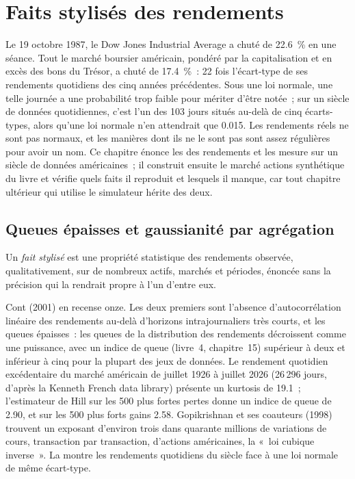 \chapter{Faits stylisés des rendements}\label{ch:rs:stylised-facts-of-returns}

Le 19 octobre 1987, le Dow Jones Industrial Average a chuté de 22.6~\% en une séance. Tout le marché boursier américain, pondéré par la capitalisation et
en excès des bons du Trésor, a chuté de 17.4~\%~: 22 fois l'écart-type de ses rendements quotidiens des cinq années précédentes. Sous une loi normale,
une telle journée a une probabilité trop faible pour mériter d'être notée~; sur un siècle de données quotidiennes, c'est l'un des 103 jours situés au-delà de cinq
écarts-types, alors qu'une loi normale n'en attendrait que 0.015. Les rendements réels ne sont pas normaux, et les manières dont ils ne le sont pas sont
assez régulières pour avoir un nom. Ce chapitre énonce les  des rendements et les mesure sur un siècle de données américaines~; il
construit ensuite le marché actions synthétique du livre et vérifie quels faits il reproduit et lesquels il manque, car tout chapitre ultérieur
qui utilise le simulateur hérite des deux.

\section{Queues épaisses et gaussianité par agrégation}

\begin{definition}\label{def:rs:stylised-facts-of-returns:fact}
Un \emph{fait stylisé} est une propriété statistique des rendements observée, qualitativement, sur de nombreux actifs,
marchés et périodes, énoncée sans la précision qui la rendrait propre à l'un d'entre eux.
\end{definition}

Cont (2001) en recense onze. Les deux premiers sont l'absence d'autocorrélation linéaire des rendements au-delà d'horizons intrajournaliers très courts,
et les queues épaisses~: les queues de la distribution des rendements décroissent comme une puissance, avec un indice de queue (livre~4, chapitre~15) supérieur à
deux et inférieur à cinq pour la plupart des jeux de données. Le rendement quotidien excédentaire du marché américain de juillet 1926 à juillet 2026 (26\,296 jours, d'après la
Kenneth French data library) présente un kurtosis de 19.1~; l'estimateur de Hill sur les 500 plus fortes pertes donne un indice de queue de 2.90, et
sur les 500 plus forts gains 2.58. Gopikrishnan et ses coauteurs (1998) trouvent un exposant d'environ trois dans quarante millions de variations de cours, transaction par transaction,
d'actions américaines, la «~loi cubique inverse~». La  montre les rendements quotidiens du siècle
face à une loi normale de même écart-type.

